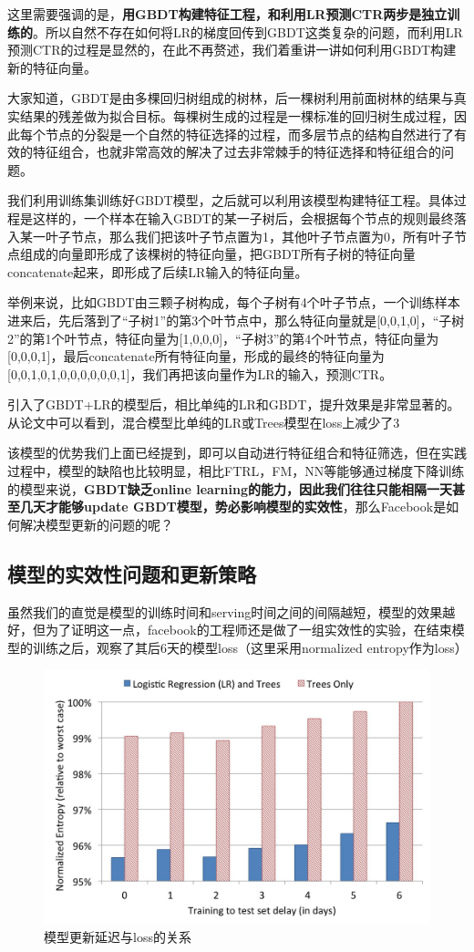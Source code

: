 \documentclass[12pt]{article}
\begin{document}
这里需要强调的是，\textbf{用GBDT构建特征工程，和利用LR预测CTR两步是独立训练的}。所以自然不存在如何将LR的梯度回传到GBDT这类复杂的问题，而利用LR预测CTR的过程是显然的，在此不再赘述，我们着重讲一讲如何利用GBDT构建新的特征向量。

大家知道，GBDT是由多棵回归树组成的树林，后一棵树利用前面树林的结果与真实结果的残差做为拟合目标。每棵树生成的过程是一棵标准的回归树生成过程，因此每个节点的分裂是一个自然的特征选择的过程，而多层节点的结构自然进行了有效的特征组合，也就非常高效的解决了过去非常棘手的特征选择和特征组合的问题。

我们利用训练集训练好GBDT模型，之后就可以利用该模型构建特征工程。具体过程是这样的，一个样本在输入GBDT的某一子树后，会根据每个节点的规则最终落入某一叶子节点，那么我们把该叶子节点置为1，其他叶子节点置为0，所有叶子节点组成的向量即形成了该棵树的特征向量，把GBDT所有子树的特征向量concatenate起来，即形成了后续LR输入的特征向量。

举例来说，比如GBDT由三颗子树构成，每个子树有4个叶子节点，一个训练样本进来后，先后落到了“子树1”的第3个叶节点中，那么特征向量就是[0,0,1,0]，“子树2”的第1个叶节点，特征向量为[1,0,0,0]，“子树3”的第4个叶节点，特征向量为[0,0,0,1]，最后concatenate所有特征向量，形成的最终的特征向量为[0,0,1,0,1,0,0,0,0,0,0,1]，我们再把该向量作为LR的输入，预测CTR。

引入了GBDT+LR的模型后，相比单纯的LR和GBDT，提升效果是非常显著的。从论文中可以看到，混合模型比单纯的LR或Trees模型在loss上减少了3%

该模型的优势我们上面已经提到，即可以自动进行特征组合和特征筛选，但在实践过程中，模型的缺陷也比较明显，相比FTRL，FM，NN等能够通过梯度下降训练的模型来说，\textbf{GBDT缺乏online learning的能力，因此我们往往只能相隔一天甚至几天才能够update GBDT模型，势必影响模型的实效性}，那么Facebook是如何解决模型更新的问题的呢？

\subsection{模型的实效性问题和更新策略}
虽然我们的直觉是模型的训练时间和serving时间之间的间隔越短，模型的效果越好，但为了证明这一点，facebook的工程师还是做了一组实效性的实验，在结束模型的训练之后，观察了其后6天的模型loss（这里采用normalized entropy作为loss）
\begin{figure}[H]
    \centering
    \includegraphics[width=.6\textwidth]{fig/Facebook_GTDT_LR_Training_Delay.jpg}
    \caption{模型更新延迟与loss的关系}
\end{figure}
\end{document}
